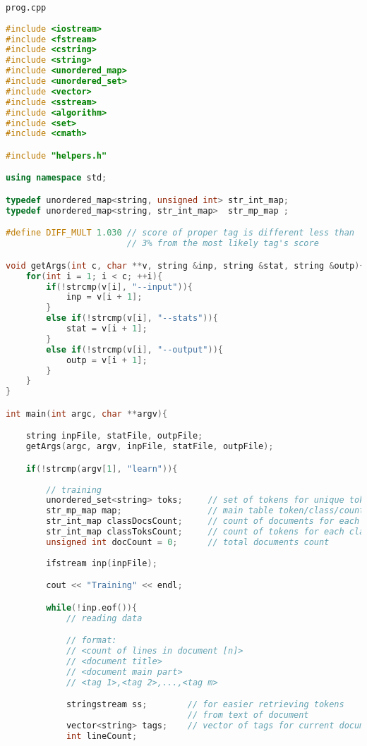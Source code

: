 \documentclass[12pt,a4paper]{scrartcl}
\begin{document}
\verb|prog.cpp|
\begin{lstlisting}[language=C++, basicstyle=\scriptsize]
#include <iostream>
#include <fstream>
#include <cstring>
#include <string>
#include <unordered_map>
#include <unordered_set>
#include <vector>
#include <sstream>
#include <algorithm>
#include <set>
#include <cmath>

#include "helpers.h"

using namespace std;

typedef unordered_map<string, unsigned int> str_int_map; 
typedef unordered_map<string, str_int_map>  str_mp_map ;

#define DIFF_MULT 1.030 // score of proper tag is different less than 
                        // 3% from the most likely tag's score

void getArgs(int c, char **v, string &inp, string &stat, string &outp){
    for(int i = 1; i < c; ++i){
        if(!strcmp(v[i], "--input")){
            inp = v[i + 1];
        }
        else if(!strcmp(v[i], "--stats")){
            stat = v[i + 1];
        }
        else if(!strcmp(v[i], "--output")){
            outp = v[i + 1];
        }
    }
}

int main(int argc, char **argv){

    string inpFile, statFile, outpFile;
    getArgs(argc, argv, inpFile, statFile, outpFile);

    if(!strcmp(argv[1], "learn")){
    
        // training
        unordered_set<string> toks;     // set of tokens for unique tokens counting 
        str_mp_map map;                 // main table token/class/count
        str_int_map classDocsCount;     // count of documents for each class
        str_int_map classToksCount;     // count of tokens for each class
        unsigned int docCount = 0;      // total documents count
        
        ifstream inp(inpFile);

        cout << "Training" << endl;

        while(!inp.eof()){
            // reading data

            // format:
            // <count of lines in document [n]> 
            // <document title>
            // <document main part>
            // <tag 1>,<tag 2>,...,<tag m>

            stringstream ss;        // for easier retrieving tokens 
                                    // from text of document
            vector<string> tags;    // vector of tags for current document
            int lineCount;


\end{lstlisting}
\end{document}
